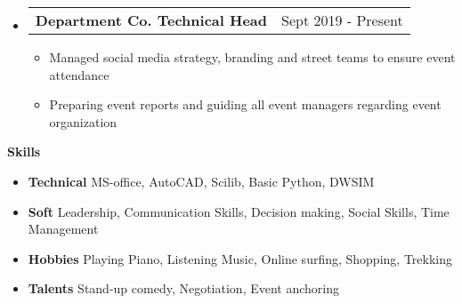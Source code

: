 \documentclass[letterpaper,12pt]{article}[leftmargin=*]
\makeatletter
\def \entryspacing {-0pt}
\renewcommand{\section}[2]{\vspace{5pt}
  \colorbox{secondary}{\color{white}\raggedbottom\normalsize\textbf{{#1}{\hspace{7pt}#2}}}
}
\newcommand{\resumeEntryStart}{\begin{itemize}[leftmargin=2.5mm]}
\newcommand{\resumeEntryEnd}{\end{itemize}\vspace{\entryspacing}}
\newcommand{\resumeItemListStart}{\begin{itemize}[leftmargin=4.5mm]}
\newcommand{\resumeItemListEnd}{\end{itemize}}
\newcommand{\resumeItem}[1]{
  \item\small{
    {#1 \vspace{-2pt}}
  }
}
\newcommand{\resumeEntryTD}[2]{
  \vspace{-1pt}\item[]
    \begin{tabular*}{0.97\textwidth}{l@{\extracolsep{\fill}}r}
      \textbf{\color{primary}#1} & {\firabook\color{accent}\small#2} \\
    \end{tabular*}\vspace{-6pt}
}
\newcommand{\resumeEntryS}[2]{
  \item[]\small{
    \textbf{\color{primary}#1 }{ #2 \vspace{-6pt}}
  }
}
\makeatother
\begin{document}
  \resumeEntryStart
      \resumeEntryTD
      {Department Co. Technical Head}{Sept 2019 - Present}
    \resumeItemListStart
      \resumeItem {Managed social media strategy, branding and street teams to ensure event attendance}
      \resumeItem {Preparing event reports and guiding all event managers regarding event organization}
    \resumeItemListEnd
  \resumeEntryEnd


  
\section{\faGears}{Skills}
 \resumeEntryStart
  \resumeEntryS{Technical} {MS-office, AutoCAD, Scilib, Basic Python, DWSIM}
  \vspace{4pt}
  \resumeEntryS{Soft}{Leadership, Communication Skills, Decision making, Social Skills, Time Management}
  \vspace{4pt}
  \resumeEntryS{Hobbies} {Playing Piano, Listening Music, Online surfing, Shopping, Trekking}
  \vspace{4pt}
  \resumeEntryS{Talents} {Stand-up comedy, Negotiation, Event anchoring}
 \resumeEntryEnd
\end{document}
